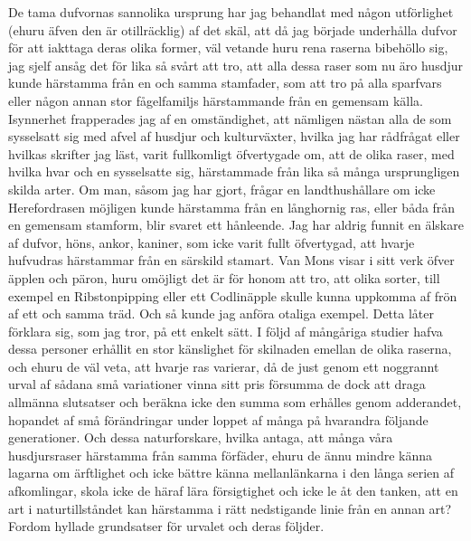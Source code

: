 De tama dufvornas sannolika ursprung har jag behandlat med någon utförlighet (ehuru äfven den är otillräcklig) af det skäl, att då jag började underhålla dufvor för att iakttaga deras olika former, väl vetande huru rena raserna bibehöllo sig, jag sjelf ansåg det för lika så svårt att tro, att alla dessa raser som nu äro husdjur kunde härstamma från en och samma stamfader, som att tro på alla sparfvars eller någon annan stor fågelfamiljs härstammande från en gemensam källa. Isynnerhet frapperades jag af en omständighet, att nämligen nästan alla de som sysselsatt sig med afvel af husdjur och kulturväxter, hvilka jag har rådfrågat eller hvilkas skrifter jag läst, varit fullkomligt öfvertygade om, att de olika raser, med hvilka hvar och en sysselsatte sig, härstammade från lika så många ursprungligen skilda arter. Om man, såsom jag har gjort, frågar en landthushållare om icke Herefordrasen möjligen kunde härstamma från en långhornig ras, eller båda från en gemensam stamform, blir svaret ett hånleende. Jag har aldrig funnit en älskare af dufvor, höns, ankor, kaniner, som icke varit fullt öfvertygad, att hvarje hufvudras härstammar från en särskild stamart. Van Mons visar i sitt verk öfver äpplen och päron, huru omöjligt det är för honom att tro, att olika sorter, till exempel en Ribstonpipping eller ett Codlinäpple skulle kunna uppkomma af frön af ett och samma träd. Och så kunde jag anföra otaliga exempel. Detta låter förklara sig, som jag tror, på ett enkelt sätt. I följd af mångåriga studier hafva dessa personer erhållit en stor känslighet för skilnaden emellan de olika raserna, och ehuru de väl veta, att hvarje ras varierar, då de just genom ett noggrannt urval af sådana små variationer vinna sitt pris försumma de dock att draga allmänna slutsatser och beräkna icke den summa som erhålles genom adderandet, hopandet af små förändringar under loppet af många på hvarandra följande generationer. Och dessa naturforskare, hvilka antaga, att många våra husdjursraser härstamma från samma förfäder, ehuru de ännu mindre känna lagarna om ärftlighet och icke bättre känna mellanlänkarna i den långa serien af afkomlingar, skola icke de häraf lära försigtighet och icke le åt den tanken, att en art i naturtillståndet kan härstamma i rätt nedstigande linie från en annan art?
Fordom hyllade grundsatser för urvalet och deras
följder.

